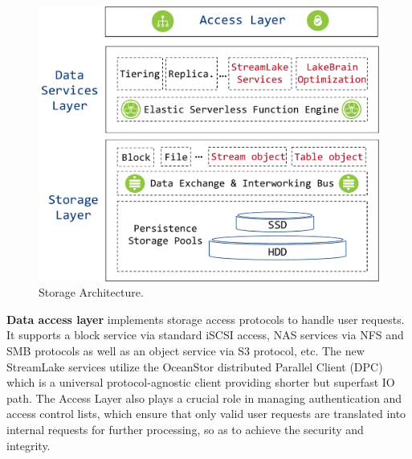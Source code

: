 
 
\begin{figure}[!t]
	\centering
	\includegraphics[scale=0.33]{figures/archi}
	\vspace{-1em}
	\caption{\sys Storage Architecture.}
	\label{fig:archi}
	\vspace{-2em}
\end{figure}

\noindent \textbf{Data access layer} implements storage access protocols to handle user requests. It supports a block service via standard iSCSI access, NAS services via NFS and SMB protocols as well as an object service via S3 protocol, etc.
The new StreamLake services utilize the OceanStor distributed Parallel Client (DPC) which is a universal protocol-agnostic client providing shorter but superfast IO path. 
The Access Layer also plays a crucial role in managing authentication and access control lists, which ensure that only valid user requests are translated into internal requests for further processing, so as to achieve  the security and integrity.
 
 

 
 
 